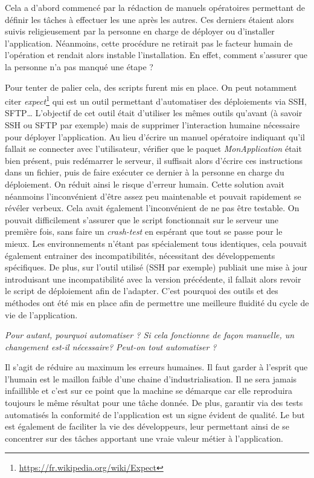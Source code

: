 Cela a d'abord commencé par la rédaction de manuels opératoires permettant de définir les tâches à effectuer les une après les autres. Ces derniers étaient alors suivis religieusement par la personne en charge de déployer ou d'installer l'application. Néanmoins, cette procédure ne retirait pas le facteur humain de l'opération et rendait alors instable l'installation. En effet, comment s'assurer que la personne n'a pas manqué une étape ? 

Pour tenter de palier cela, des scripts furent mis en place. On peut notamment citer \emph{expect}\footnote{\url{https://fr.wikipedia.org/wiki/Expect}} qui est un outil permettant d'automatiser des déploiements via \gls{SSH}, \gls{SFTP}\ldots{} L'objectif de cet outil était d'utiliser les mêmes outils qu'avant (à savoir \gls{SSH} ou \gls{SFTP} par exemple) mais de supprimer l'interaction humaine nécessaire pour déployer l'application. Au lieu d'écrire un manuel opératoire indiquant qu'il fallait se connecter avec l'utilisateur, vérifier que le paquet \emph{MonApplication} était bien présent, puis redémarrer le serveur, il suffisait alors d'écrire ces instructions dans un fichier, puis de faire exécuter ce dernier à la personne en charge du déploiement. On réduit ainsi le risque d'erreur humain. Cette solution avait néanmoins l'inconvénient d'être assez peu maintenable et pouvait rapidement se révéler verbeux. Cela avait également l'inconvénient de ne pas être testable. On pouvait difficilement s'assurer que le script fonctionnait sur le serveur une première fois, sans faire un \emph{crash-test} en espérant que tout se passe pour le mieux. Les environnements n'étant pas spécialement tous identiques, cela pouvait également entrainer des incompatibilités, nécessitant des développements spécifiques. De plus, sur l'outil utilisé (\gls{SSH} par exemple) publiait une mise à jour introduisant une incompatibilité avec la version précédente, il fallait alors revoir le script de déploiement afin de l'adapter. C'est pourquoi des outils et des méthodes ont été mis en place afin de permettre une meilleure fluidité du cycle de vie de l'application. 

\emph{Pour autant, pourquoi automatiser ? Si cela fonctionne de façon manuelle, un changement est-il nécessaire? Peut-on tout automatiser ?}

Il s'agit de réduire au maximum les erreurs humaines. Il faut garder à l'esprit que l'humain est le maillon faible d'une chaine d'industrialisation. Il ne sera jamais infaillible et c'est sur ce point que la machine se démarque car elle reproduira toujours le même résultat pour une tâche donnée. De plus, garantir via des tests automatisés la conformité de l'application est un signe évident de qualité. Le but est également de faciliter la vie des développeurs, leur permettant ainsi de se concentrer sur des tâches apportant une vraie valeur métier à l'application.

